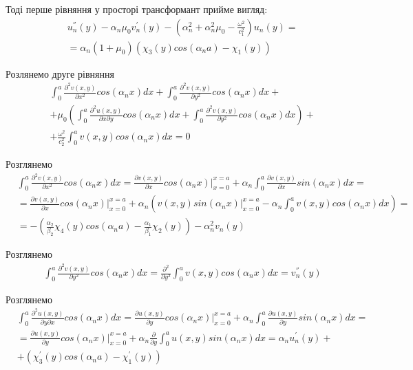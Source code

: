 Тоді перше рівняння у просторі трансформант прийме вигляд:
\begin{align*}
    &u_n^{''}(y) - \alpha_n \mu_0 v_n^{'}(y) -(\alpha_n^2 + \alpha_n^2 \mu_0 - \frac{\omega^2}{c_1^2}) u_n(y) = \\
    &= \alpha_n(1 + \mu_0)(\chi_3(y) cos(\alpha_n a) - \chi_1(y))
\end{align*}

Розлянемо друге рівняння
\begin{align*}
    &\int_{0}^{a} \frac{\partial^2 v(x,y)}{\partial x^2} cos(\alpha_n x)dx + \int_{0}^{a} \frac{\partial^2 v(x,y)}{\partial y^2} cos(\alpha_n x)dx + \\ 
    & + \mu_0 \left( \int_{0}^{a} \frac{\partial^2 u(x,y)}{\partial x \partial y} cos(\alpha_n x)dx +  \int_{0}^{a} \frac{\partial^2 v(x,y)}{\partial y^2} cos(\alpha_n x) dx\right) + \\
    & + \frac{\omega^2}{c_2^2} \int_{0}^{a} v(x,y) cos(\alpha_n x)dx = 0
\end{align*}

Розглянемо
\begin{align*}
    &\int_{0}^{a} \frac{\partial^2 v(x,y)}{\partial x^2} cos(\alpha_n x)dx = \frac{\partial v(x,y)}{\partial x} cos(\alpha_n x) |_{x=0}^{x=a} + \alpha_n \int_{0}^{a} \frac{\partial v(x,y)}{\partial x} sin(\alpha_n x) dx = \\
    &=\frac{\partial v(x,y)}{\partial x} cos(\alpha_n x) |_{x=0}^{x=a} + \alpha_n \left(v(x,y) sin(\alpha_n x)|_{x=0}^{x=a} - \alpha_n \int_{0}^{a} v(x,y) cos(\alpha_n x) dx  \right) = \\
    &= -(\frac{\alpha_2}{\beta_2}\chi_4(y) cos(\alpha_n a) - \frac{\alpha_1}{\beta_1}\chi_2(y)) -\alpha_n^2 v_n(y)
\end{align*}

Розглянемо
\begin{align*}
    &\int_{0}^{a} \frac{\partial^2 v(x,y)}{\partial y^2} cos(\alpha_n x)dx = \frac{\partial^2}{\partial y^2} \int_{0}^{a} v(x,y) cos(\alpha_n x)dx = v_n^{''}(y)
\end{align*}

Розглянемо
\begin{align*}
    &\int_{0}^{a} \frac{\partial^2 u(x,y)}{\partial y \partial x} cos(\alpha_n x)dx = \frac{\partial u(x,y)}{\partial y} cos(\alpha_n x) |_{x=0}^{x=a} + \alpha_n \int_{0}^{a} \frac{\partial u(x,y)}{\partial y} sin(\alpha_n x) dx = \\
    &=\frac{\partial u(x,y)}{\partial y} cos(\alpha_n x) |_{x=0}^{x=a} + \alpha_n \frac{\partial}{\partial y} \int_{0}^{a} u(x,y) sin(\alpha_n x) dx = \alpha_n u_n^{'}(y) + \\
    &+(\chi_3^{'}(y) cos(\alpha_n a) -\chi_1^{'}(y))
\end{align*}

